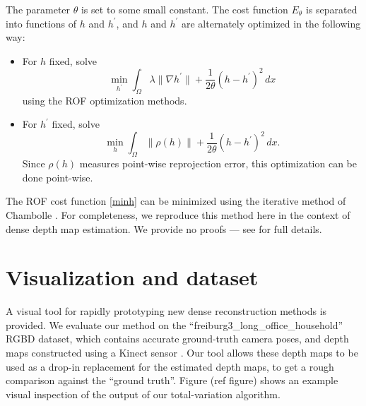\documentclass[conference]{IEEEtran}
\begin{document}
The parameter $\theta$ is set to some small constant.
The cost function $E_\theta$ is separated into functions of $h$ and $h^\prime$,
and $h$ and $h^\prime$ are alternately optimized in the following way:
\begin{itemize}
    \item For $h$ fixed, solve
        \begin{equation}\label{minh}
            \min_{h^\prime} \int_\Omega \lambda \|\nabla h^\prime\| + \frac{1}{2\theta}(h - h^\prime)^2\,dx
        \end{equation}
    using the ROF optimization methods.
    \item For $h^\prime$ fixed, solve
        \begin{equation}\label{minhhat}
            \min_h \int_\Omega \|\rho(h)\| + \frac{1}{2\theta}(h - h^\prime)^2\,dx.
        \end{equation}
        Since $\rho(h)$ measures point-wise reprojection error, this
        optimization can be done point-wise.
\end{itemize}
The ROF cost function \eqref{minh} can be minimized using the iterative method of Chambolle \cite{chambolle}. For completeness, we reproduce this
method here in the context of dense depth map estimation. We provide no proofs --- see \cite{chambolle} for full details.




\section{Visualization and dataset}
A visual tool for rapidly prototyping new dense reconstruction methods is provided.
We evaluate our method on the ``freiburg3\_long\_office\_household'' RGBD dataset, which contains accurate ground-truth camera poses, and
depth maps constructed using a Kinect sensor \cite{dataset} \cite{largescale}. Our tool allows these depth maps to be used as a drop-in replacement for the estimated
depth maps, to get a rough comparison against the ``ground truth''. Figure (ref figure) shows an example visual inspection of the output
of our total-variation algorithm.
\end{document}
